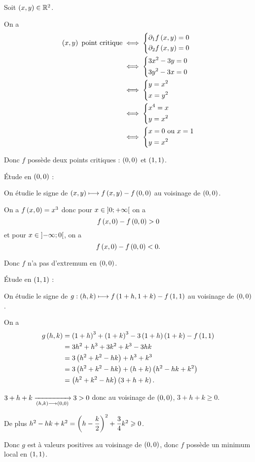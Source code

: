 \begin{corr}
Soit \(\left(x,y\right)\in\mathbb{R}^2\).

On a \[\begin{aligned}
\paren{x,y}\text{ point critique}&\ssi\begin{dcases}
\pdif{1}f\paren{x,y}=0 \\
\pdif{2}f\paren{x,y}=0
\end{dcases} \\
&\ssi\begin{dcases}
3x^2-3y=0 \\
3y^2-3x=0
\end{dcases} \\
&\ssi\begin{dcases}
y=x^2 \\
x=y^2
\end{dcases} \\
&\ssi\begin{dcases}
x^4=x \\
y=x^2
\end{dcases} \\
&\ssi\begin{dcases}
x=0\text{ ou }x=1 \\
y=x^2
\end{dcases}
\end{aligned}\]

Donc \(f\) possède deux points critiques : \(\left(0,0\right)\) et \(\left(1,1\right)\).

Étude en \(\left(0,0\right)\) :

On étudie le signe de \(\left(x,y\right)\longmapsto f\left(x,y\right)-f\left(0,0\right)\) au voisinage de \(\left(0,0\right)\).

On a \(f\left(x,0\right)=x^3\) donc pour \(x\in\left]0;+\infty\right[\) on a \[f\left(x,0\right)-f\left(0,0\right)>0\] et pour \(x\in\left]-\infty;0\right[\), on a \[f\left(x,0\right)-f\left(0,0\right)<0.\]

Donc \(f\) n'a pas d'extremum en \(\left(0,0\right)\).

Étude en \(\left(1,1\right)\) :

On étudie le signe de \(g:\left(h,k\right)\longmapsto f\left(1+h,1+k\right)-f\left(1,1\right)\) au voisinage de \(\left(0,0\right)\).

On a \[\begin{aligned}
g\left(h,k\right)&=\left(1+h\right)^3+\left(1+k\right)^3-3\left(1+h\right)\left(1+k\right)-f\left(1,1\right) \\
&=3h^2+h^3+3k^2+k^3-3hk \\
&=3\left(h^2+k^2-hk\right)+h^3+k^3 \\
&=3\left(h^2+k^2-hk\right)+\left(h+k\right)\left(h^2-hk+k^2\right) \\
&=\left(h^2+k^2-hk\right)\left(3+h+k\right).
\end{aligned}\]

\(3+h+k\xrightarrow[\left(h,k\right)\longrightarrow\left(0,0\right)]{}3>0\) donc au voisinage de \(\left(0,0\right)\), \(3+h+k\geq0\).

De plus \(h^2-hk+k^2=\left(h-\dfrac{k}{2}\right)^2+\dfrac{3}{4}k^2\geqslant0\).

Donc \(g\) est à valeurs positives au voisinage de \(\left(0,0\right)\), donc \(f\) possède un minimum local en \(\left(1,1\right)\).
\end{corr}


